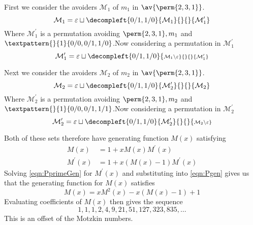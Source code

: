 \begin{frame}
  First we consider the avoiders \(\mathcal{M}_1\) of \(m_1\) in \(\av{\perm{2,3,1}}\).
  \begin{equation*}
    \mathcal{M}_1 = \varepsilon \sqcup
    \decompleft{0/1,1/0}{\mathcal{M}_1}{}{}{\mathcal{M}^\prime_1}
\end{equation*}
Where \(\mathcal{M}^\prime_1\) is a permutation avoiding \(\perm{2,3,1}, m_1\)
and \(\textpattern{}{1}{0/0,0/1,1/0}\).\pause Now considering a permutation in \(\mathcal{M}^\prime_1\)
\begin{equation*}
    \mathcal{M}^\prime_1 = \varepsilon \sqcup
    \decompleft{0/1,1/0}{\scriptstyle \mathcal{M}_1\setminus\varepsilon}{}{}{\mathcal{M}^\prime_1}
\end{equation*}
\end{frame}

\begin{frame}
  Next we consider the avoiders \(\mathcal{M}_2\) of \(m_2\) in \(\av{\perm{2,3,1}}\).
  \begin{equation*}
    \mathcal{M}_2 = \varepsilon \sqcup
    \decompleft{0/1,1/0}{\mathcal{M}^\prime_2}{}{}{\mathcal{M}_2}
\end{equation*}
Where \(\mathcal{M}^\prime_2\) is a permutation avoiding \(\perm{2,3,1}, m_2\)
and \(\textpattern{}{1}{0/0,0/1,1/1}\).\pause Now considering a permutation in \(\mathcal{M}^\prime_2\)
\begin{equation*}
    \mathcal{M}^\prime_2 = \varepsilon \sqcup
    \decompleft{0/1,1/0}{\mathcal{M}^\prime_2}{}{}{\scriptstyle \mathcal{M}_2\setminus\varepsilon}
\end{equation*}
\end{frame}
\begin{frame}
  Both of these sets therefore have generating function \(M(x)\) satisfying
  \begin{align}
    M(x) &= 1 + xM(x)M^\prime(x) \label{eqn:Pgen}\\
    M^\prime(x) &= 1 + x(M(x)-1)M^\prime(x)\label{eqn:PprimeGen}
 \end{align}\pause
 Solving \ref{eqn:PprimeGen} for \(M^\prime(x)\) and substituting into
\ref{eqn:Pgen} gives us that the generating function for
\(M(x)\) satisfies
\begin{equation}
    M(x) = xM^2(x) - x(M(x) - 1) + 1
\end{equation}\pause
Evaluating coefficients of \(M(x)\) then gives the sequence
\begin{equation*}
    1, 1, 1, 2, 4, 9, 21, 51, 127, 323, 835,\dotsc
\end{equation*}
This is an offset of the Motzkin numbers.
\end{frame}
